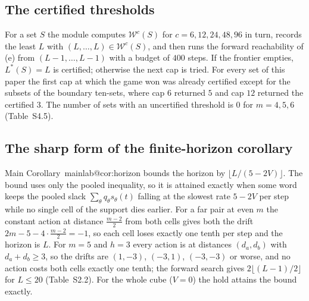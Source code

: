 \documentclass[11pt,a4paper]{article}
\makeatletter
\theoremstyle{plain}
\theoremstyle{definition}
\theoremstyle{remark}
\newcommand{\calW}{\mathcal{W}}
\newcommand{\tfr}[2]{\tfrac{#1}{#2}}
\newcommand{\Lstar}{L^{\ast}}
\newcommand{\mref}[1]{\csname mainlab@#1\endcsname}
\makeatother
\begin{document}
\subsection{The certified thresholds}
For a set $S$ the module computes $\calW^{c}(S)$ for $c=6,12,24,48,96$ in turn, records the least $L$ with $(L,\dots,L)\in\calW^{c}(S)$, and then runs the forward reachability of (e) from $(L-1,\dots,L-1)$ with a budget of $400$ steps. If the frontier empties, $\Lstar(S)=L$ is certified; otherwise the next cap is tried. For every set of this paper the first cap at which the game won was already certified except for the subsets of the boundary ten-sets, where cap $6$ returned $5$ and cap $12$ returned the certified $3$. The number of sets with an uncertified threshold is $0$ for $m=4,5,6$ (Table~S4.5).

\subsection{The sharp form of the finite-horizon corollary}
Main Corollary~\mref{cor:horizon} bounds the horizon by $\lfloor L/(5-2V)\rfloor$. The bound uses only the pooled inequality, so it is attained exactly when some word keeps the pooled slack $\sum_\theta q_\theta s_\theta(t)$ falling at the slowest rate $5-2V$ per step while no single cell of the support dies earlier. For a far pair at even $m$ the constant action at distance $\tfr{m-2}2$ from both cells gives both the drift $2m-5-4\cdot\tfr{m-2}{2}=-1$, so each cell loses exactly one tenth per step and the horizon is $L$. For $m=5$ and $h=3$ every action is at distances $(d_a,d_b)$ with $d_a+d_b\ge3$, so the drifts are $(1,-3)$, $(-3,1)$, $(-3,-3)$ or worse, and no action costs both cells exactly one tenth; the forward search gives $2\lfloor(L-1)/2\rfloor$ for $L\le20$ (Table~S2.2). For the whole cube ($V=0$) the hold attains the bound exactly.
\end{document}
